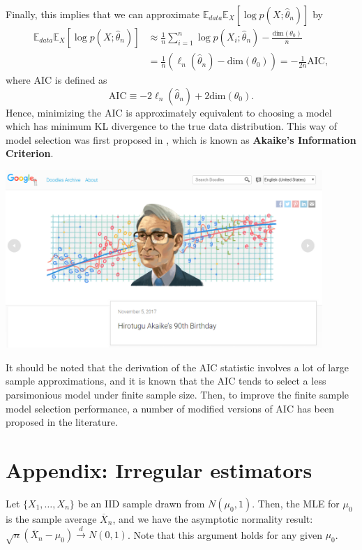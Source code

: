 \documentclass[10.5pt, A4paper, openany, uplatex]{book}
\newcommand{\E}{\mathbb{E}}
\renewcommand{\hat}{\widehat}
\renewcommand{\bar}{\overline}
\numberwithin{equation}{section}
\begin{document}
Finally, this implies that we can approximate $\E_{data} \E_X[\log p(X; \hat \theta_n)]$ by
\begin{align*}
	\E_{data} \E_X[\log p(X; \hat \theta_n)] 
	& \approx \frac{1}{n}\sum_{i = 1}^n \log p(X_i; \hat \theta_n) - \frac{\text{dim}(\theta_0)}{n}\\
	& = \frac{1}{n} ( \ell_n(\hat \theta_n) - \text{dim}(\theta_0) ) = - \frac{1}{2n} \text{AIC}, 
\end{align*}
where $\text{AIC}$ is defined as
\[
	\text{AIC} \equiv - 2\ell_n(\hat \theta_n) + 2 \text{dim}(\theta_0).
\]
Hence, minimizing the AIC is approximately equivalent to choosing a model which has minimum KL divergence to the true data distribution.
This way of model selection was first proposed in \cite{akaike1973information}, which is known as \textbf{Akaike's Information Criterion}.
\begin{center}
	\includegraphics[width=12cm]{akaike.png}
\end{center}
It should be noted that the derivation of the AIC statistic involves a lot of large sample approximations, and it is known that the AIC tends to select a less parsimonious model under finite sample size.
Then, to improve the finite sample model selection performance, a number of modified versions of AIC has been proposed in the literature.

\section*{Appendix: Irregular estimators}

Let $\{X_1, \ldots, X_n\}$ be an IID sample drawn from $N(\mu_0, 1)$.
Then, the MLE for $\mu_0$ is the sample average $\bar X_n$, and we have the asymptotic normality result: $\sqrt{n}(\bar X_n - \mu_0) \overset{d}{\to} N(0, 1)$. 
Note that this argument holds for any given $\mu_0$.
\end{document}
